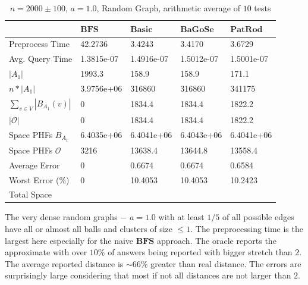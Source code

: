 \documentclass[shortabstract, lic, english]{iithesis}
\theoremstyle{definition} \newtheorem{definition}{Definition}[chapter]
\theoremstyle{remark} \newtheorem{remark}[definition]{Observation}
\theoremstyle{plain} \newtheorem{theorem}[definition]{Theorem}
\theoremstyle{plain} \newtheorem{lemma}[definition]{Lemma}
\theoremstyle{plain} \newtheorem{conjecture}[definition]{Conjecture}
\begin{document}
\begin{table}[H] \label{test:random.a10}
    \centering
    \begin{tabular}{ |p{3cm}||p{2cm}|p{2cm}|p{2cm}|p{2cm}|  } 
        \hline
        & $\mathbf{BFS}$ & $\mathbf{Basic}$ & $\mathbf{BaGoSe}$ & $\mathbf{PatRod}$ \\
        \hline
        \hline
        Preprocess Time                 & 42.2736    & 3.4243     & 3.4170      & 3.6729     \\
        \hline
        Avg. Query Time                 & 1.3815e-07 & 1.4916e-07 & 1.5012e-07  & 1.5001e-07 \\
        \hline
        $|A_1|$                         & 1993.3     & 158.9      & 158.9       & 171.1      \\
        \hline
        $n * |A_1|$                     & 3.9756e+06 & 316860     & 316860      & 341175     \\
        \hline
        $\sum_{v \in V} |B_{A_1}(v)| $  & 0          & 1834.4     & 1834.4      & 1822.2     \\
        \hline
        $|\mathcal{O}|$                 & 0          & 1834.4     & 1834.4      & 1822.2     \\
        \hline
        Space PHFs $B_{A_1}$            & 6.4035e+06 & 6.4041e+06 & 6.4043e+06  & 6.4041e+06 \\
        \hline
        Space PHFs $\mathcal{O}$        & 3216       & 13638.4    & 13644.8     & 13558.4    \\
        \hline
        Average Error                   & 0          & 0.6674     & 0.6674      & 0.6584     \\
        \hline
        Worst Error (\%)                & 0          & 10.4053    & 10.4053     & 10.2423    \\
        \hline
        Total Space                     &            &            &             &            \\
        \hline

    \end{tabular}
    \caption{$n = 2000 \pm 100$, $a = 1.0$, Random Graph, arithmetic average of $10$ tests}
\end{table}

The very dense random graphs $-$ $a=1.0$ with at least $1/5$ of all possible edges have all or almost all balls and clusters of size $\leq 1$.
The preprocessing time is the largest here especially for the naive $\mathbf{BFS}$ approach.
The oracle reports the approximate with over $10\%$ of answers being reported with bigger stretch than $2$. The average reported distance is $\sim 66 \%$ greater than real distance.
The errors are surprisingly large considering that most if not all distances are not larger than $2$.
\end{document}

